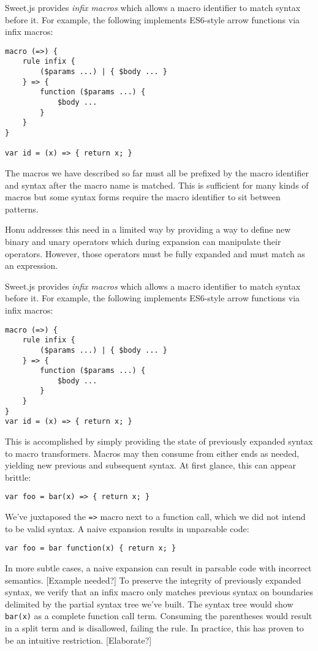 \documentclass[onecolumn]{sigplanconf-onecolumn}
\begin{document}
Sweet.js provides \emph{infix macros} which allows a macro identifier to
match syntax before it. For example, the following implements
ES6-style arrow functions via infix macros:

\begin{lstlisting}
macro (=>) {
    rule infix {
        ($params ...) | { $body ... }
    } => {
        function ($params ...) {
            $body ...
        }
    }
}

var id = (x) => { return x; }
\end{lstlisting}

The macros we have described so far must all be prefixed by the macro
identifier and syntax after the macro name is matched. This is
sufficient for many kinds of macros but some syntax forms require the
macro identifier to sit between patterns.

Honu addresses this need in a limited way by providing a way to define
new binary and unary operators which during expansion can manipulate
their operators. However, those operators must be fully expanded and
must match as an expression.

Sweet.js provides \emph{infix macros} which allows a macro identifier to
match syntax before it. For example, the following implements
ES6-style arrow functions via infix macros:

\begin{lstlisting}
macro (=>) {
    rule infix {
        ($params ...) | { $body ... }
    } => {
        function ($params ...) {
            $body ...
        }
    }
}
var id = (x) => { return x; }
\end{lstlisting}

This is accomplished by simply providing the state of previously
expanded syntax to macro transformers. Macros may then consume from
either ends as needed, yielding new previous and subsequent syntax. At
first glance, this can appear brittle:

\begin{lstlisting}
var foo = bar(x) => { return x; }
\end{lstlisting}

We've juxtaposed the \verb!=>! macro next to a function call, which we did
not intend to be valid syntax. A naive expansion results in unparsable
code:

\begin{lstlisting}
var foo = bar function(x) { return x; }
\end{lstlisting}

In more subtle cases, a naive expansion can result in parsable code
with incorrect semantics. [Example needed?] To preserve the integrity
of previously expanded syntax, we verify that an infix macro only
matches previous syntax on boundaries delimited by the partial syntax
tree we've built. The syntax tree would show \verb!bar(x)! as a complete
function call term. Consuming the parentheses would result in a split
term and is disallowed, failing the rule. In practice, this has proven
to be an intuitive restriction. [Elaborate?]
\end{document}

